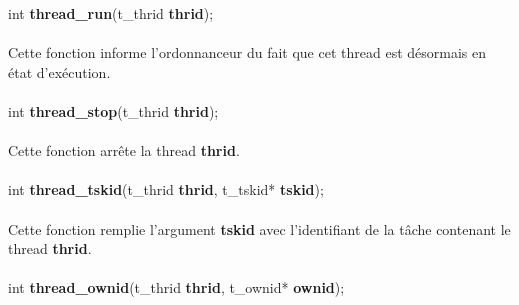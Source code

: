 \documentclass[10pt,a4wide]{article}
\begin{document}
\hspace{1.5cm}int \textbf{thread\_run}(t\_thrid \textbf{thrid});

\paragraph{}

Cette fonction informe l'ordonnanceur du fait que cet thread est
d\'esormais en \'etat d'ex\'ecution.

\paragraph{}

\hspace{1.5cm}int \textbf{thread\_stop}(t\_thrid \textbf{thrid});

\paragraph{}

Cette fonction arr\^ete la thread \textbf{thrid}.

\paragraph{}

\hspace{1.5cm}int \textbf{thread\_tskid}(t\_thrid \textbf{thrid},
                                         t\_tskid* \textbf{tskid});

\paragraph{}

Cette fonction remplie l'argument \textbf{tskid} avec l'identifiant de
la t\^ache contenant le thread \textbf{thrid}.

\paragraph{}

\hspace{1.5cm}int \textbf{thread\_ownid}(t\_thrid \textbf{thrid},
                                         t\_ownid* \textbf{ownid});

\paragraph{}
\end{document}
